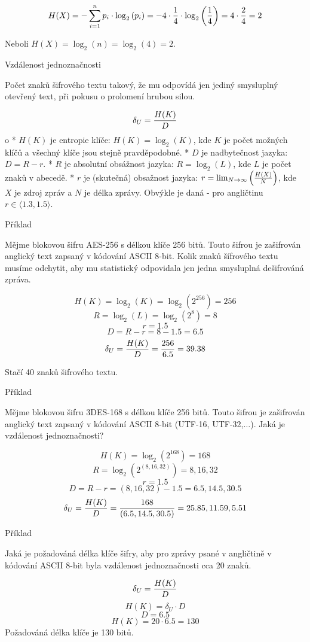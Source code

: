 $$
H(X) = - \sum_{i = 1}^{n}{ p_i \cdot \log_{2}{(p_i)} }
= -4 \cdot {1 \over 4} \cdot \log_{2}{ \left( {1 \over 4} \right) }
= 4 \cdot {2 \over 4} = 2
$$

\noindent
Neboli $H(X) = \log_{2}{(n)} = \log_{2}{(4)} = 2$.

\sec Vzdálenost jednoznačnosti

Počet znaků šifrového textu takový, že mu odpovídá jen jediný smysluplný otevřený text, při pokusu o prolomení hrubou silou.

$$
\delta_U = {H(K) \over D}
$$
\begitems \style o
* $H(K)$ je entropie klíče: $H(K) = \log_{2}{(K)}$, kde $K$ je počet možných klíčů a všechný klíče jsou stejně pravděpodobné.
* $D$ je nadbytečnost jazyka: $D = R - r$.
* $R$ je absolutní obsážnost jazyka: $R = \log_{2}{(L)}$, kde $L$ je počet znaků v abecedě.
* $r$ je (skutečná) obsažnost jazyka: $r = \lim_{N \rightarrow \infty}{ \left( {H(X) \over N} \right) }$, kde $X$ je zdroj zpráv a $N$ je délka zprávy.
Obvýkle je daná - pro angličtinu $r \in \langle 1.3, 1.5 \rangle$.
\enditems

\secc Příklad

Mějme blokovou šifru AES-256 s délkou klíče 256 bitů. Touto šifrou je zašifrován anglický text zapsaný v kódování ASCII 8-bit. Kolik znaků šífrového textu musíme odchytit, aby mu statistický odpovidala jen jedna smysluplná dešifrováná zpráva.

$$H(K) = \log_{2}{(K)} = \log_{2}{(2^{256})} = 256$$
$$R = \log_{2}{(L)} = \log_{2}{(2^8)} = 8$$
$$r = 1.5$$
$$D = R - r = 8 - 1.5 = 6.5$$
$$\delta_U = {H(K) \over D} = {256 \over 6.5} = 39.38$$

\noindent
Stačí 40 znaků šifrového textu.

\secc Příklad

Mějme blokovou šifru 3DES-168 s délkou klíče 256 bitů. Touto šifrou je zašifrován anglický text zapsaný v kódování ASCII 8-bit (UTF-16, UTF-32,$\ldots$). Jaká je vzdálenost jednoznačnosti?

$$H(K) = \log_{2}{(2^{168})} = 168$$
$$R = \log_{2}{( 2^{(8, 16, 32)} )} = 8, 16, 32$$
$$r = 1.5$$
$$D = R - r = (8, 16, 32) - 1.5 = 6.5, 14.5, 30.5$$
$$\delta_U = {H(K) \over D} = {168 \over (6.5, 14.5, 30.5)} = 25.85, 11.59, 5.51$$

\secc Příklad

Jaká je požadováná délka klíče šifry, aby pro zprávy psané v angličtině v kódování ASCII 8-bit byla vzdálenost jednoznačnosti cca 20 znaků.

$$\delta_U = {H(K) \over D}$$
$$H(K) = \delta_U \cdot D$$
$$D = 6.5$$
$$H(K) = 20 \cdot 6.5 = 130$$
\noindent
Požadováná délka klíče je 130 bitů.

